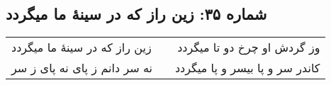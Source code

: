\begin{center}
\section*{شماره ۳۵: زین راز که در سینۀ ما میگردد}
\label{sec:035}
\begin{longtable}{l p{0.5cm} r}
زین راز که در سینهٔ ما میگردد
&&
وز گردش او چرخ دو تا میگردد
\\
نه سر دانم ز پای نه پای ز سر
&&
کاندر سر و پا بیسر و پا میگردد
\\
\end{longtable}
\end{center}
